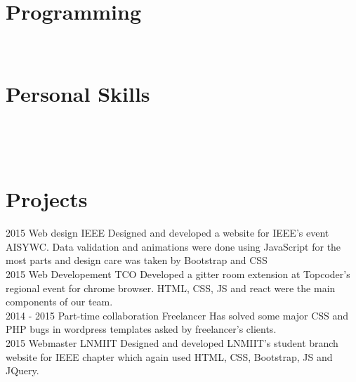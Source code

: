 \documentclass[]{friggeri-cv}
\begin{document}
\begin{aside}
  \section{Programming}
    ~
  \section{Personal Skills}
    ~
\end{aside}
~
\section{ Projects}
\begin{entrylist}
  \entry
    {2015}
    {Web design}
    {IEEE}
    {Designed and developed a website for IEEE's event AISYWC. Data validation and animations were done using JavaScript for the most parts and design care was taken by Bootstrap and CSS \\}
  \entry
    {2015}
    {Web Developement}
    {TCO}
    {Developed a gitter room extension at Topcoder's regional event for chrome browser. HTML, CSS, JS and react were the main components of our team. \\}
    \entry
    {2014 - 2015}
    {Part-time collaboration}
    {Freelancer}
    {Has solved some major CSS and PHP bugs in wordpress templates asked by freelancer's clients. \\}
    \entry
    {2015}
    {Webmaster}
    {LNMIIT}
    {Designed and developed LNMIIT's student branch website for IEEE chapter which again used HTML, CSS, Bootstrap, JS and JQuery.}
\end{entrylist}
\\
\end{document}
